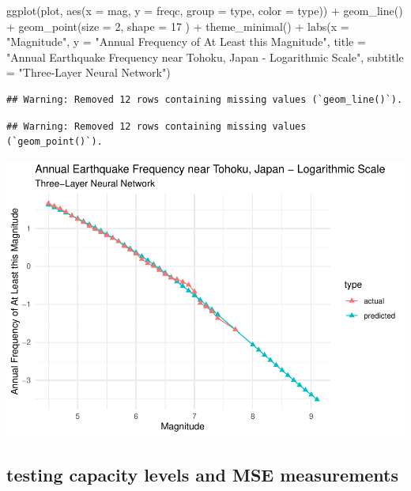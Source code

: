 \documentclass[
]{article}
\newenvironment{Shaded}{\begin{snugshade}}{\end{snugshade}}
\newcommand{\AttributeTok}[1]{\textcolor[rgb]{0.77,0.63,0.00}{#1}}
\newcommand{\DecValTok}[1]{\textcolor[rgb]{0.00,0.00,0.81}{#1}}
\newcommand{\FunctionTok}[1]{\textcolor[rgb]{0.00,0.00,0.00}{#1}}
\newcommand{\NormalTok}[1]{#1}
\newcommand{\SpecialCharTok}[1]{\textcolor[rgb]{0.00,0.00,0.00}{#1}}
\newcommand{\StringTok}[1]{\textcolor[rgb]{0.31,0.60,0.02}{#1}}
\begin{document}
\begin{Shaded}
\begin{Highlighting}[]
\FunctionTok{ggplot}\NormalTok{(plot, }\FunctionTok{aes}\NormalTok{(}\AttributeTok{x =}\NormalTok{ mag, }\AttributeTok{y =}\NormalTok{ freqc, }\AttributeTok{group =}\NormalTok{ type, }\AttributeTok{color =}\NormalTok{ type)) }\SpecialCharTok{+}
  \FunctionTok{geom\_line}\NormalTok{() }\SpecialCharTok{+}
  \FunctionTok{geom\_point}\NormalTok{(}\AttributeTok{size =} \DecValTok{2}\NormalTok{, }\AttributeTok{shape =} \DecValTok{17}\NormalTok{ ) }\SpecialCharTok{+}
  \FunctionTok{theme\_minimal}\NormalTok{() }\SpecialCharTok{+}
  \FunctionTok{labs}\NormalTok{(}\AttributeTok{x =} \StringTok{"Magnitude"}\NormalTok{,}
       \AttributeTok{y =} \StringTok{"Annual Frequency of At Least this Magnitude"}\NormalTok{,}
       \AttributeTok{title =} \StringTok{"Annual Earthquake Frequency near Tohoku, Japan {-} Logarithmic Scale"}\NormalTok{,}
       \AttributeTok{subtitle =} \StringTok{"Three{-}Layer Neural Network"}\NormalTok{)}
\end{Highlighting}
\end{Shaded}

\begin{verbatim}
## Warning: Removed 12 rows containing missing values (`geom_line()`).
\end{verbatim}

\begin{verbatim}
## Warning: Removed 12 rows containing missing values (`geom_point()`).
\end{verbatim}

\includegraphics{earthquakes_files/figure-latex/unnamed-chunk-7-1.pdf}

\hypertarget{testing-capacity-levels-and-mse-measurements}{%
\subsection{testing capacity levels and MSE
measurements}\label{testing-capacity-levels-and-mse-measurements}}
\end{document}
